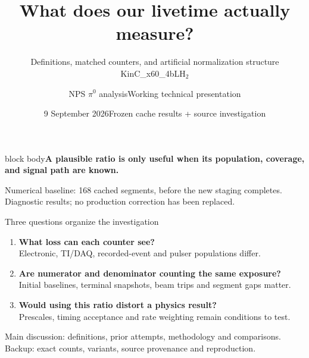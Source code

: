 \documentclass[aspectratio=169,11pt]{beamer}
\title{What does our livetime actually measure?}
\subtitle{Definitions, matched counters, and artificial normalization structure\\KinC\_x60\_4b\enspace LH$_2$}
\author{NPS $\pi^0$ analysis\quad Working technical presentation}
\date{9 September 2026\quad Frozen cache results + source investigation}
\newcommand{\source}[1]{\par\vfill{\scriptsize\color{muted}#1\par}}
\newcommand{\takeaway}[1]{\begin{beamercolorbox}[sep=2.5mm,wd=\linewidth]{block body}\textbf{#1}\end{beamercolorbox}}
\begin{document}
\begin{frame}[plain]
\par\vspace{7mm}
{\LARGE\bfseries\inserttitle\par}\vspace{4mm}{\large\insertsubtitle\par}\vspace{6mm}
\takeaway{A plausible ratio is only useful when its population, coverage, and signal path are known.}
\vfill\small\insertauthor\par\insertdate\par\vspace{2mm}
\scriptsize Numerical baseline: 168 cached segments, before the new staging completes.\\
Diagnostic results; no production correction has been replaced.
\end{frame}

\begin{frame}{Three questions organize the investigation}
\begin{enumerate}\setlength\itemsep{5mm}
\item \textbf{What loss can each counter see?}\\Electronic, TI/DAQ, recorded-event and pulser populations differ.
\item \textbf{Are numerator and denominator counting the same exposure?}\\Initial baselines, terminal snapshots, beam trips and segment gaps matter.
\item \textbf{Would using this ratio distort a physics result?}\\Prescales, timing acceptance and rate weighting remain conditions to test.
\end{enumerate}
\source{Main discussion: definitions, prior attempts, methodology and comparisons. Backup: exact counts, variants, source provenance and reproduction.}
\end{frame}
\end{document}
